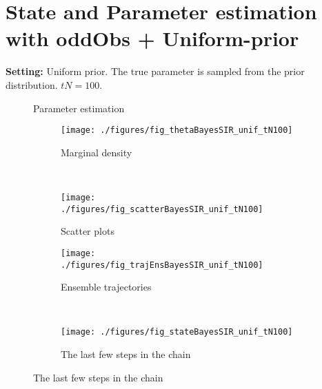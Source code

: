 \documentclass[12pt]{article}
\begin{document}
\section{State and Parameter estimation with oddObs + Uniform-prior}
{\bf Setting:} Uniform prior. The true parameter is sampled from the prior distribution. $tN=100$. 
\begin{figure}[h!]
   \caption{Parameter estimation}\label{fig:traj} \vspace{-2mm}
    \centering
    \hspace{-20mm}
    \begin{subfigure}[b]{0.45\textwidth}        \caption{Marginal density}\vspace{-2mm}
        \texttt{[image: ./figures/fig\_thetaBayesSIR\_unif\_tN100]} %
        \label{fig:gull}
    \end{subfigure}
    ~ %
    \begin{subfigure}[b]{0.45\textwidth}          \caption{Scatter plots}\vspace{-2mm}
        \texttt{[image: ./figures/fig\_scatterBayesSIR\_unif\_tN100]} %
        \label{fig:tiger}
    \end{subfigure}
  \caption{State estimation} \label{fig:traj} \vspace{-4mm}
    \centering
    \hspace{-20mm}
    \begin{subfigure}[b]{0.45\textwidth}
        \texttt{[image: ./figures/fig\_trajEnsBayesSIR\_unif\_tN100]}
        \caption{Ensemble trajectories}
        \label{fig:gull}
    \end{subfigure}
    ~ %
    \begin{subfigure}[b]{0.45\textwidth}
        \texttt{[image: ./figures/fig\_stateBayesSIR\_unif\_tN100]}
          \caption{The last few steps in the chain}
        \label{fig:tiger}
    \end{subfigure}
\end{figure}
\end{document}
